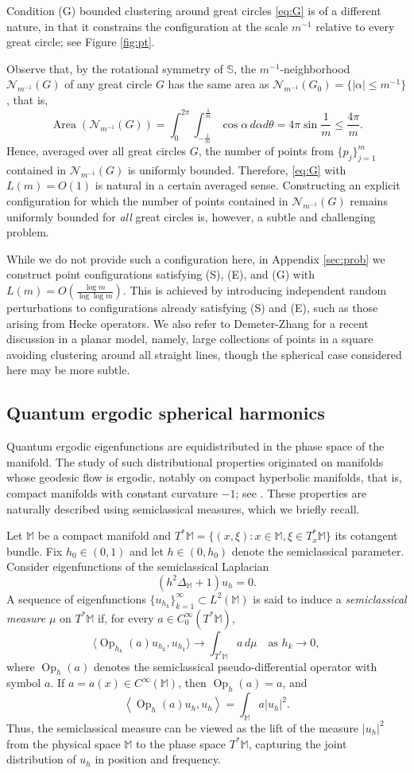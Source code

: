 \documentclass[12pt,reqno]{amsart}
\DeclareMathOperator{\Area}{Area}
\DeclareMathOperator{\Op}{Op}
\newcommand{\M}{\mathbb{M}}
\newcommand{\Nc}{\mathcal{N}}
\newcommand{\Sb}{\mathbb{S}}
\theoremstyle{plain}
\theoremstyle{definition}
\theoremstyle{remark}
\numberwithin{equation}{section}
\begin{document}
Condition (G) bounded clustering around great circles \eqref{eq:G} is of a different nature, in that it constrains the configuration at the scale $m^{-1}$ relative to every great circle; see Figure \ref{fig:pt}.

Observe that, by the rotational symmetry of $\Sb$, the $m^{-1}$-neighborhood $\Nc_{m^{-1}}(G)$ of any great circle $G$ has the same area as $\Nc_{m^{-1}}(G_0)=\{|\alpha|\le m^{-1}\}$, that is,
$$\Area\left(\Nc_{m^{-1}}(G)\right)=\int_0^{2\pi}\int_{-\frac1m}^{\frac1m}\cos\alpha\,d\alpha d\theta=4\pi\sin\frac1m\le\frac{4\pi}{m}.$$
Hence, averaged over all great circles $G$, the number of points from $\{p_j\}_{j=1}^m$ contained in $\Nc_{m^{-1}}(G)$ is uniformly bounded. Therefore, \eqref{eq:G} with $L(m)=O(1)$ is natural in a certain averaged sense. Constructing an explicit configuration for which the number of points contained in $\Nc_{m^{-1}}(G)$ remains uniformly bounded for \emph{all} great circles is, however, a subtle and challenging problem. 

While we do not provide such a configuration here, in Appendix \ref{sec:prob} we construct point configurations satisfying (S), (E), and (G) with $L(m)=O\left(\frac{\log m}{\log\log m}\right)$. This is achieved by introducing independent random perturbations to configurations already satisfying (S) and (E), such as those arising from Hecke operators. We also refer to Demeter-Zhang \cite{DZ} for a recent discussion in a planar model, namely, large collections of points in a square avoiding clustering around all straight lines, though the spherical case considered here may be more subtle.

\subsection{Quantum ergodic spherical harmonics}\label{sec:QE0}
Quantum ergodic eigenfunctions are equidistributed in the phase space of the manifold. The study of such distributional properties originated on manifolds whose geodesic flow is ergodic, notably on compact hyperbolic manifolds, that is, compact manifolds with constant curvature $-1$; see \cite{KH}. These properties are naturally described using semiclassical measures, which we briefly recall.

Let $\M$ be a compact manifold and $T^*\M=\{(x,\xi):x\in\M,\xi\in T_x^*\M\}$ its cotangent bundle. Fix $h_0\in(0,1)$ and let $h\in(0,h_0)$ denote the semiclassical parameter. Consider eigenfunctions of the semiclassical Laplacian
$$\left(h^2\Delta_\M+1\right)u_h=0.$$
A sequence of eigenfunctions $\{u_{h_k}\}_{k=1}^\infty\subset L^2(\M)$ is said to induce a \textit{semiclassical measure} $\mu$ on $T^*\M$ if, for every $a\in C_0^\infty(T^*\M)$,
$$\langle\Op_{h_k}(a)u_{h_k},u_{h_k}\rangle\to\int_{T^*\M}a\,d\mu\quad\text{as }h_k\to0,$$
where $\Op_h(a)$ denotes the semiclassical pseudo-differential operator with symbol $a$. If $a=a(x)\in C^\infty(\M)$, then $\Op_h(a)=a$, and 
$$\left\langle\Op_h(a)u_h,u_h\right\rangle=\int_\M a\left|u_h\right|^2.$$ 
Thus, the semiclassical measure can be viewed as the lift of the measure $|u_h|^2$ from the physical space $\M$ to the phase space $T^*\M$, capturing the joint distribution of $u_h$ in position and frequency.
\end{document}
